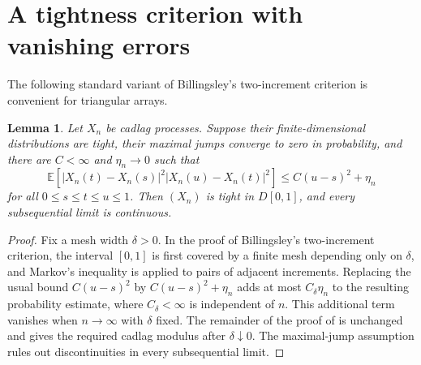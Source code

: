 \documentclass[11pt]{article}
\newtheorem{lemma}[theorem]{Lemma}
\theoremstyle{definition}
\theoremstyle{remark}
\newcommand{\Ee}{\mathbb E}
\begin{document}
\section{A tightness criterion with vanishing errors}

The following standard variant of Billingsley's two-increment criterion is
convenient for triangular arrays.

\begin{lemma}\label{lem:tightness-criterion}
Let $X_n$ be cadlag processes.  Suppose their finite-dimensional
distributions are tight, their maximal jumps converge to zero in
probability, and there are $C<\infty$ and $\eta_n\to0$ such that
\[
 \Ee\left[
 |X_n(t)-X_n(s)|^2
 |X_n(u)-X_n(t)|^2
 \right]
 \le C(u-s)^2+\eta_n
\]
for all $0\le s\le t\le u\le1$.  Then $(X_n)$ is tight in $D[0,1]$, and
every subsequential limit is continuous.
\end{lemma}

\begin{proof}
Fix a mesh width $\delta>0$.  In the proof of Billingsley's
two-increment criterion, the interval $[0,1]$ is first covered by a finite
mesh depending only on $\delta$, and Markov's inequality is applied to
pairs of adjacent increments.  Replacing the usual bound
$C(u-s)^2$ by $C(u-s)^2+\eta_n$ adds at most
$C_\delta\eta_n$ to the resulting probability estimate, where
$C_\delta<\infty$ is independent of $n$.  This additional term vanishes
when $n\to\infty$ with $\delta$ fixed.  The remainder of the proof of
\cite[Theorem 13.5]{Billingsley1999} is unchanged and gives the required
cadlag modulus after $\delta\downarrow0$.  The maximal-jump assumption
rules out discontinuities in every subsequential limit.
\end{proof}
\end{document}
